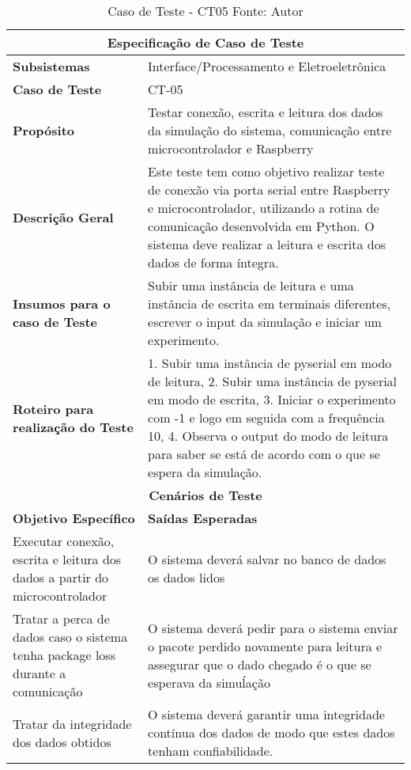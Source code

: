 \begin{table}[H]
    \begin{center}
        \begin{tabular}{|p{5cm}|p{12cm}|}
            \hline
            \multicolumn{2}{|c|}{\textbf{Especificação de Caso de Teste}} \\ \hline
                \textbf{Subsistemas}                               & Interface/Processamento e Eletroeletrônica \\ \hline
                \textbf{Caso de Teste}                             & CT-05 \\ \hline
                \textbf{Propósito}                                     & Testar conexão, escrita e leitura dos dados da simulação do sistema, comunicação entre microcontrolador e Raspberry \\ \hline
                \textbf{Descrição Geral}                           & Este teste tem como objetivo realizar teste de conexão via porta serial entre Raspberry e microcontrolador, utilizando a rotina de comunicação desenvolvida em Python. O sistema deve realizar a leitura e escrita dos dados de forma íntegra. \\ \hline
                \textbf{Insumos para o caso de Teste}    & Subir uma instância de leitura e uma instância de escrita em terminais diferentes, escrever o input da simulação e iniciar um experimento. \\ \hline
                \textbf{Roteiro para realização do Teste}&  1. Subir uma instância de pyserial em modo de leitura, 2. Subir uma instância de pyserial em modo de escrita, 3. Iniciar o experimento com -1 e logo em seguida com a frequência 10, 4. Observa o output do modo de leitura para saber se está de acordo com o que se espera da simulação. \\ \hline
            \multicolumn{2}{|c|}{\textbf{Cenários de Teste}} \\ \hline
                \textbf{Objetivo Específico}                      & \textbf{Saídas Esperadas} \\ \hline
                Executar conexão, escrita e leitura dos dados a partir do microcontrolador & O sistema deverá salvar no banco de dados os dados lidos \\ \hline
                Tratar a perca de dados caso o sistema tenha package loss durante a comunicação & O sistema deverá pedir para o sistema enviar o pacote perdido novamente para leitura e assegurar que o dado chegado é o que se esperava da simuĺação \\ \hline
                Tratar da integridade dos dados obtidos  & O sistema deverá garantir uma integridade contínua dos dados de modo que estes dados tenham confiabilidade. \\ \hline
        \end{tabular}
    \end{center}
    \caption[Caso de Teste - CT05]{Caso de Teste - CT05
    \protect Fonte: Autor}
    \label{CT-05}
\end{table}


